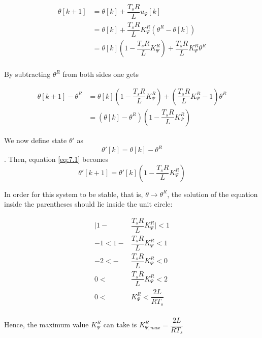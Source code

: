 \begin{align*}
  \theta[k+1] &= \theta[k] + \dfrac{T_s R}{L} u_{\Psi}[k]  \\
            ~ &= \theta[k] + \dfrac{T_s R}{L} K_{\Psi}^R (\theta^R - \theta[k]) \\
            ~ &= \theta[k](1 - \dfrac{T_s R}{L} K_{\Psi}^R) + \dfrac{T_s R}{L} K_{\Psi}^R \theta^R  \\
\end{align*}

By subtracting $\theta^R$ from both sides one gets

\begin{align}
  \theta[k+1] - \theta^R &= \theta[k](1 - \dfrac{T_s R}{L} K_{\Psi}^R) + (\dfrac{T_s R}{L} K_{\Psi}^R - 1) \theta^R \nonumber \\
                     ~ &= (\theta[k] - \theta^R)(1 - \dfrac{T_s R}{L} K_{\Psi}^R) \label{eq:7.1}
\end{align}

We now define state $\theta'$ as $$\theta'[k] = \theta[k] - \theta^R$$. Then,
equation \ref{eq:7.1} becomes $$\theta'[k+1] = \theta'[k](1 - \dfrac{T_s R}{L} K_{\Psi}^R)$$

In order for this system to be stable, that is, $\theta \rightarrow \theta^R$,
the solution of the equation inside the parentheses should lie inside the unit
circle:

\begin{align*}
  \Big|1 - &\dfrac{T_s R}{L} K_{\Psi}^R\Big| < 1 \\
  -1 < 1 - &\dfrac{T_s R}{L} K_{\Psi}^R < 1 \\
  -2 < - &\dfrac{T_s R}{L} K_{\Psi}^R < 0 \\
   0 < &\dfrac{T_s R}{L} K_{\Psi}^R < 2 \\
   0 < &K_{\Psi}^R < \dfrac{2L}{R T_s} \\
\end{align*}

Hence, the maximum value $K_{\Psi}^R$ can take is $K_{\Psi,max}^R = \dfrac{2L}{R T_s}$
